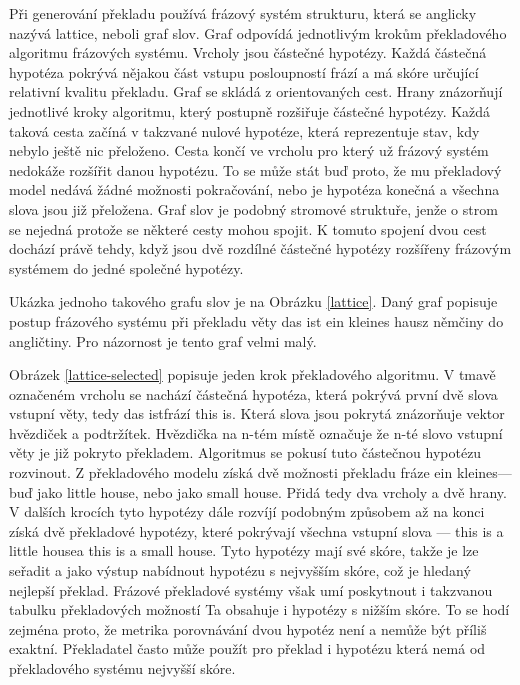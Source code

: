 \documentclass[12pt,a4paper]{report}
\begin{document}
Při generování překladu používá frázový systém strukturu, která se anglicky nazývá \clqq lattice\crqq , neboli graf slov. Graf odpovídá jednotlivým krokům překladového algoritmu frázových systému. Vrcholy jsou částečné hypotézy. Každá částečná hypotéza pokrývá nějakou část vstupu posloupností frází a má skóre určující relativní kvalitu překladu. Graf se skládá z orientovaných cest. Hrany znázorňují jednotlivé kroky algoritmu, který postupně rozšiřuje částečné hypotézy. Každá taková cesta začíná v takzvané nulové hypotéze, která reprezentuje stav, kdy nebylo ještě nic přeloženo. Cesta končí ve vrcholu pro který už frázový systém nedokáže rozšířit danou hypotézu. To se může stát buď proto, že mu překladový model nedává žádné možnosti pokračování, nebo je hypotéza konečná a všechna slova jsou již přeložena. Graf slov je podobný stromové struktuře, jenže o strom se nejedná protože se některé cesty mohou spojit. K tomuto spojení dvou cest dochází právě tehdy, když jsou dvě rozdílné částečné hypotézy rozšířeny frázovým systémem do jedné společné hypotézy.

Ukázka jednoho takového grafu slov je na Obrázku \ref{lattice}. Daný graf popisuje postup frázového systému při překladu věty \clqq das ist ein kleines haus\crqq  z němčiny do angličtiny. Pro názornost je tento graf velmi malý.

Obrázek \ref{lattice-selected} popisuje jeden krok překladového algoritmu. V tmavě označeném vrcholu se nachází částečná hypotéza, která pokrývá první dvě slova vstupní věty, tedy \clqq das ist\crqq  frází \clqq this is\crqq. Která slova jsou pokrytá znázorňuje vektor hvězdiček a podtržítek. Hvězdička na n-tém místě označuje že n-té slovo vstupní věty je již pokryto překladem. Algoritmus se pokusí tuto částečnou hypotézu rozvinout. Z překladového modelu získá dvě možnosti překladu fráze \clqq ein kleines\crqq  --- buď jako \clqq little house\crqq , nebo jako \clqq small house\crqq . Přidá tedy dva vrcholy a dvě hrany. V dalších krocích tyto hypotézy dále rozvíjí podobným způsobem až na konci získá dvě překladové hypotézy, které pokrývají všechna vstupní slova --- \clqq this is a little house\crqq  a \clqq this is a small house\crqq . Tyto hypotézy mají své skóre, takže je lze seřadit a jako výstup nabídnout hypotézu s nejvyšším skóre, což je hledaný nejlepší překlad. Frázové překladové systémy však umí poskytnout i takzvanou tabulku překladových možností Ta obsahuje i hypotézy s nižším skóre. To se hodí zejména proto, že metrika porovnávání dvou hypotéz není a nemůže být příliš exaktní. Překladatel často může použít pro překlad i hypotézu která nemá od překladového systému nejvyšší skóre.
\end{document}
